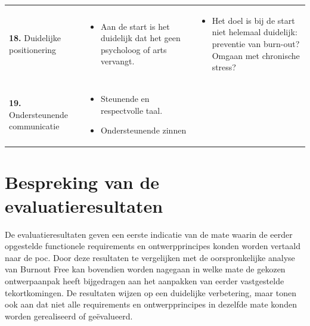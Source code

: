 {\begin{longtable}{
            >{\raggedright\arraybackslash}p{5.23cm}
            >{\raggedright\arraybackslash}p{4.93cm}
            >{\raggedright\arraybackslash}p{4.93cm}
        }
        \addlinespace[5pt]
        
        \textbf{18.} Duidelijke positionering 
        &  
        \begin{itemize}[nosep,leftmargin=*,itemsep=10pt] 
            \renewcommand{\labelitemi}{+} 
            \item Aan de start is het duidelijk dat het geen psycholoog of arts vervangt.
        \end{itemize} 
        &  
        \begin{itemize}[nosep,leftmargin=*,itemsep=10pt] 
            \renewcommand{\labelitemi}{-} 
            \item Het doel is bij de start niet helemaal duidelijk: preventie van burn-out? Omgaan met chronische stress?
        \end{itemize} 
        \\
        
        \addlinespace[5pt]
        
        \textbf{19.} Ondersteunende communicatie 
        &  
        \begin{itemize}[nosep,leftmargin=*,itemsep=10pt] 
            \renewcommand{\labelitemi}{+} 
            \item Steunende en respectvolle taal.
            \item Ondersteunende zinnen
        \end{itemize} 
        &
        \\ 
    \end{longtable}
}

\newpage


\section{Bespreking van de evaluatieresultaten}
\label{sec:evaluatie-bespreking}

\vspace{1em}

De evaluatieresultaten geven een eerste indicatie van de mate waarin de eerder opgestelde functionele requirements en ontwerpprincipes konden worden vertaald naar de \acrshort{poc}. Door deze resultaten te vergelijken met de oorspronkelijke analyse van Burnout Free kan bovendien worden nagegaan in welke mate de gekozen ontwerpaanpak heeft bijgedragen aan het aanpakken van eerder vastgestelde tekortkomingen. De resultaten wijzen op een duidelijke verbetering, maar tonen ook aan dat niet alle requirements en ontwerpprincipes in dezelfde mate konden worden gerealiseerd of geëvalueerd.

